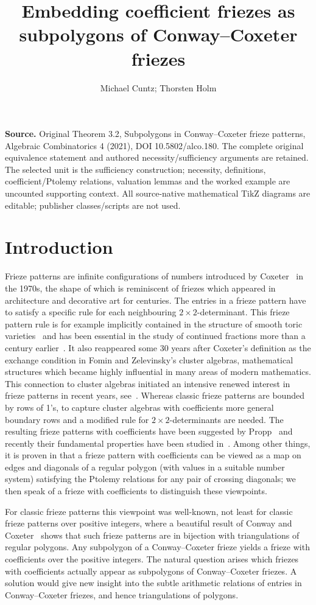 \documentclass[10pt]{amsart}
\title{Embedding coefficient friezes as subpolygons of Conway--Coxeter friezes}
\author{Michael Cuntz; Thorsten Holm}
\date{}
\numberwithin{equation}{section}
\theoremstyle{definition}
\theoremstyle{remark}
\begin{document}
\maketitle
\noindent\textbf{Source.} Original Theorem 3.2, Subpolygons in Conway--Coxeter frieze patterns, Algebraic Combinatorics 4 (2021), DOI 10.5802/alco.180. The complete original equivalence statement and authored necessity/sufficiency arguments are retained. The selected unit is the sufficiency construction; necessity, definitions, coefficient/Ptolemy relations, valuation lemmas and the worked example are uncounted supporting context. All source-native mathematical TikZ diagrams are editable; publisher classes/scripts are not used.
\section{Introduction}

Frieze patterns are infinite configurations of numbers introduced by
Coxeter~\cite{Cox71} in the 1970s, the shape of which is reminiscent of 
friezes which appeared in architecture and decorative art for centuries.
The entries in a frieze pattern have to satisfy a specific rule for each
neighbouring $2\times 2$-determinant. This frieze pattern rule is for example implicitly contained in the structure of smooth toric varieties~\cite[1.6]{Oda} and has been essential in the study of continued fractions more than a century earlier~\cite[\S~51]{b-Perron29}.
It also reappeared some 30 years after Coxeter's definition as the exchange condition in Fomin and Zelevinsky's 
cluster algebras, mathematical structures
which became highly influential in many areas of modern 
mathematics. This connection to cluster algebras initiated an intensive 
renewed interest in frieze patterns in recent years, see~\cite{MG15}. Whereas classic frieze
patterns are bounded by rows of 1's, to capture cluster algebras with 
coefficients more general boundary rows and a modified rule for 
$2\times 2$-determinants are needed. The resulting frieze patterns with coefficients
have been suggested by Propp~\cite{Propp} and recently their fundamental
properties have been studied in~\cite{CHJ}. Among other things, it is proven in
\cite{CHJ} that a frieze pattern with coefficients can be viewed as a map on 
edges and diagonals of a regular polygon (with values in a suitable number
system) satisfying the Ptolemy relations for any pair of crossing diagonals;
we then speak of a frieze with coefficients to distinguish these viewpoints.

For classic frieze patterns this viewpoint was well-known, not least for 
classic frieze patterns over positive integers, where a beautiful result of
Conway and Coxeter~\cite{CC73} shows that such frieze patterns are in 
bijection with triangulations of regular polygons.
Any subpolygon of a Conway--Coxeter frieze yields a 
frieze with coefficients over the positive integers. The natural question
arises which friezes with coefficients actually appear as subpolygons of 
Conway--Coxeter friezes. A solution would give new insight into the subtle
arithmetic relations of entries in Conway--Coxeter friezes, and hence 
triangulations of polygons. 
\end{document}
